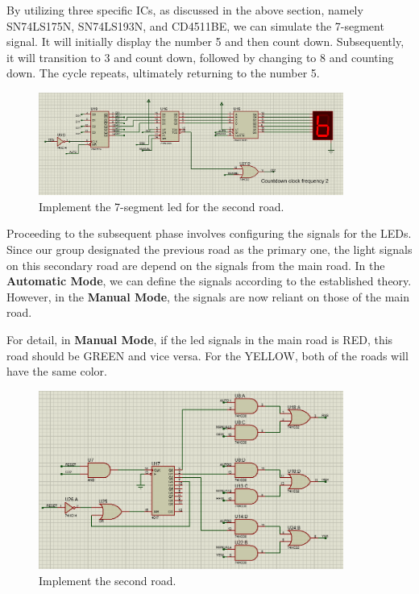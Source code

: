 \documentclass{article}
\begin{document}
By utilizing three specific ICs, as discussed in the above section, namely SN74LS175N, SN74LS193N, and CD4511BE, we can simulate the 7-segment signal. It will initially display the number 5 and then count down. Subsequently, it will transition to 3 and count down, followed by changing to 8 and counting down. The cycle repeats, ultimately returning to the number 5.\par
\begin{figure}[h]
    \centering
    \includegraphics[width=10cm]{Pic/Proteus/175N_Proteus_3.png}
    \caption{Implement the 7-segment led for the second road.}
    \label{fig:enter-label}
\end{figure}


Proceeding to the subsequent phase involves configuring the signals for the LEDs. Since our group designated the previous road as the primary one, the light signals on this secondary road are depend on the signals from the main road. In the \textbf{Automatic Mode}, we can define the signals according to the established theory. However, in the \textbf{Manual Mode}, the signals are now reliant on those of the main road.\par
For detail, in \textbf{Manual Mode}, if the led signals in the main road is RED, this road should be GREEN and vice versa. For the YELLOW, both of the roads will have the same color.\par 

\begin{figure}[h]
    \centering
    \includegraphics[width=10cm]{Pic/Proteus/4017_Proteus_1.png}
    \caption{Implement the second road.}
    \label{fig:enter-label}
\end{figure}
\end{document}
